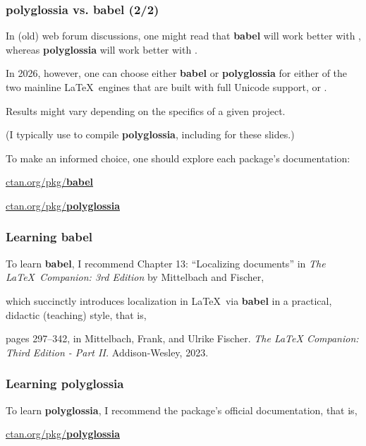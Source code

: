 \documentclass[aspectratio=169]{beamer}
\begin{document}
\begin{frame}[fragile]
	\frametitle[Polyglossia vs. Babel]{polyglossia vs. babel {\scriptsize (2/2)}}
	
In (old) web forum discussions, one might read that \textbf{babel} will work better with , whereas \textbf{polyglossia} will work better with . \break 

In 2026, however, one can choose either \textbf{babel} or \textbf{polyglossia} for either of the two mainline \LaTeX\ engines that are built with full Unicode support,  or . \break

Results might vary depending on the specifics of a given project. \break

(I typically use  to compile \textbf{polyglossia}, including for these slides.) \break
	
To make an informed choice, one should explore each package's documentation: \break

\href{https://www.ctan.org/pkg/babel}{ctan.org/pkg/\textbf{babel}} \break

\href{https://www.ctan.org/pkg/polyglossia}{ctan.org/pkg/\textbf{polyglossia}} \break
	
\end{frame}

\begin{frame}[fragile]
	\frametitle[Learning babel]{Learning babel}
	
To learn \textbf{babel}, I recommend Chapter 13: ``Localizing documents'' in \textit{The \LaTeX\ Companion: 3rd Edition} by Mittelbach and Fischer, \break

which succinctly introduces localization in \LaTeX\ via \textbf{babel} in a practical, didactic (teaching) style, that is,  \break

pages 297--342, in Mittelbach, Frank, and Ulrike Fischer. \textit{The LaTeX Companion: Third Edition - Part II.} Addison-Wesley, 2023.

\end{frame}

\begin{frame}[fragile]
	\frametitle[Learning polyglossia]{Learning polyglossia}
	
To learn \textbf{polyglossia}, I recommend the package's official documentation, that is, \break
	
\href{https://www.ctan.org/pkg/polyglossia}{ctan.org/pkg/\textbf{polyglossia}}
	
\end{frame}
\end{document}
